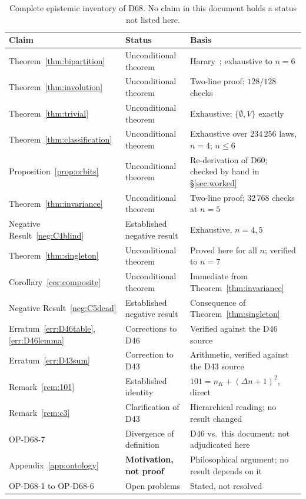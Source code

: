 \documentclass[11pt,a4paper]{article}
\begin{document}
\begin{table}[h]
\centering
\small
\begin{tabular}{llp{6.8cm}}
\toprule
\textbf{Claim} & \textbf{Status} & \textbf{Basis} \\
\midrule
Theorem~\ref{thm:bipartition} & Unconditional theorem & Harary~\citep{Harary1953}; exhaustive to $n=6$ \\
Theorem~\ref{thm:involution} & Unconditional theorem & Two-line proof; $128/128$ checks \\
Theorem~\ref{thm:trivial} & Unconditional theorem & Exhaustive; $\{\emptyset,V\}$ exactly \\
Theorem~\ref{thm:classification} & Unconditional theorem & Exhaustive over $234\,256$ laws, $n=4$; $n\le6$ \\
Proposition~\ref{prop:orbits} & Unconditional theorem & Re-derivation of D60; checked by hand in \S\ref{sec:worked} \\
Theorem~\ref{thm:invariance} & Unconditional theorem & Two-line proof; $32\,768$ checks at $n=5$ \\
Negative Result~\ref{neg:C4blind} & Established negative result & Exhaustive, $n=4,5$ \\
Theorem~\ref{thm:singleton} & Unconditional theorem & Proved here for all $n$; verified to $n=7$ \\
Corollary~\ref{cor:composite} & Unconditional theorem & Immediate from Theorem~\ref{thm:invariance} \\
Negative Result~\ref{neg:C5dead} & Established negative result & Consequence of Theorem~\ref{thm:singleton} \\
Erratum~\ref{err:D46table}, \ref{err:D46lemma} & Corrections to D46 & Verified against the D46 source \\
Erratum~\ref{err:D43sum} & Correction to D43 & Arithmetic, verified against the D43 source \\
Remark~\ref{rem:101} & Established identity & $101 = n_K + (\Delta n+1)^2$, direct \\
Remark~\ref{rem:c3} & Clarification of D43 & Hierarchical reading; no result changed \\
OP-D68-7 & Divergence of definition & D46 vs.\ this document; not adjudicated here \\
Appendix~\ref{app:ontology} & \textbf{Motivation, not proof} & Philosophical argument; no result depends on it \\
OP-D68-1 to OP-D68-6 & Open problems & Stated, not resolved \\
\bottomrule
\end{tabular}
\caption{Complete epistemic inventory of D68. No claim in this document holds a status not listed here.}
\label{tab:status}
\end{table}
\end{document}
